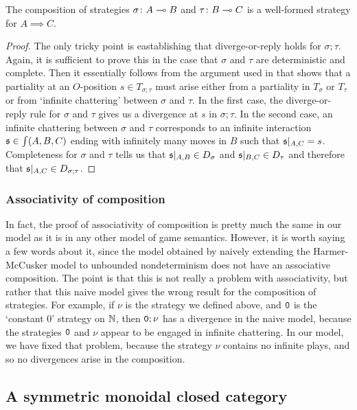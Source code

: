 \documentclass[sigplan,10pt,review]{acmart}\settopmatter{printfolios=true,printccs=false,printacmref=false}
\begin{document}
\begin{corollary}
  The composition of strategies $\sigma\colon A\multimap B$ and $\tau\colon B \multimap C$ is a well-formed strategy for $A\implies C$.
\end{corollary}
\begin{proof}
  The only tricky point is eastablishing that diverge-or-reply holds for $\sigma;\tau$.  
  Again, it is sufficient to prove this in the case that $\sigma$ and $\tau$ are deterministic and complete.
  Then it essentially follows from the argument used in \cite{abramskyjagadeesangames} that shows that a partiality at an $O$-position $s\in T_{\sigma;\tau}$ must arise either from a partiality in $T_\sigma$ or $T_\tau$ or from `infinite chattering' between $\sigma$ and $\tau$.  
  In the first case, the diverge-or-reply rule for $\sigma$ and $\tau$ gives us a divergence at $s$ in $\sigma;\tau$.  
  In the second case, an infinite chattering between $\sigma$ and $\tau$ corresponds to an infinite interaction $\mathfrak s\in\int(A,B,C)$ ending with infinitely many moves in $B$ such that $\mathfrak s\vert_{A,C}=s$. 
  Completeness for $\sigma$ and $\tau$ tells us that $\mathfrak s\vert_{A,B}\in D_\sigma$ and $\mathfrak s\vert_{B,C}\in D_\tau$ and therefore that $\mathfrak s\vert_{A,C}\in D_{\sigma;\tau}$.  
\end{proof}

\subsubsection{Associativity of composition}

In fact, the proof of associativity of composition is pretty much the same in our model as it is in any other model of game semantics.  
However, it is worth saying a few words about it, since the model obtained by naively extending the Harmer-McCusker model to unbounded nondeterminism does not have an associative composition.  
The point is that this is not really a problem with associativity, but rather that this naive model gives the wrong result for the composition of strategies.  
For example, if $\nu$ is the strategy we defined above, and ${\mathtt{0}}$ is the `constant $0$' strategy on $\mathbb{N}$, then ${\mathtt{0}};\nu$ has a divergence in the naive model, because the strategies ${\mathtt{0}}$ and $\nu$ appear to be engaged in infinite chattering.  
In our model, we have fixed that problem, because the strategy $\nu$ contains no infinite plays, and so no divergences arise in the composition.

\subsection{A symmetric monoidal closed category}
\end{document}
